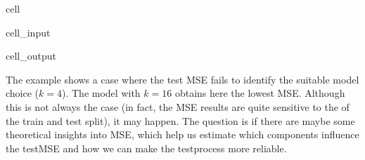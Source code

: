 \documentclass[letterpaper,10pt,english]{jupyterBook}
\begin{document}
\begin{sphinxuseclass}{cell}
\begin{sphinxVerbatimInput}
\begin{sphinxuseclass}{cell_input}
\begin{sphinxVerbatim}[commandchars=\\\{\}]
\end{sphinxVerbatim}

\end{sphinxuseclass}\end{sphinxVerbatimInput}
\begin{sphinxVerbatimOutput}

\begin{sphinxuseclass}{cell_output}
\noindent{}

\end{sphinxuseclass}\end{sphinxVerbatimOutput}

\end{sphinxuseclass}
\sphinxAtStartPar
The example shows a case where the test MSE fails to identify the suitable model choice (\(k=4\)). The model with \(k=16\) obtains here the lowest MSE. Although this is not always the case (in fact, the MSE results are quite sensitive to the  of the train and test split), it may happen. The question is if there are maybe some theoretical insights into MSE, which help us estimate which components influence the test\sphinxhyphen{}MSE and how we can make the test\sphinxhyphen{}process more reliable.
\end{document}
